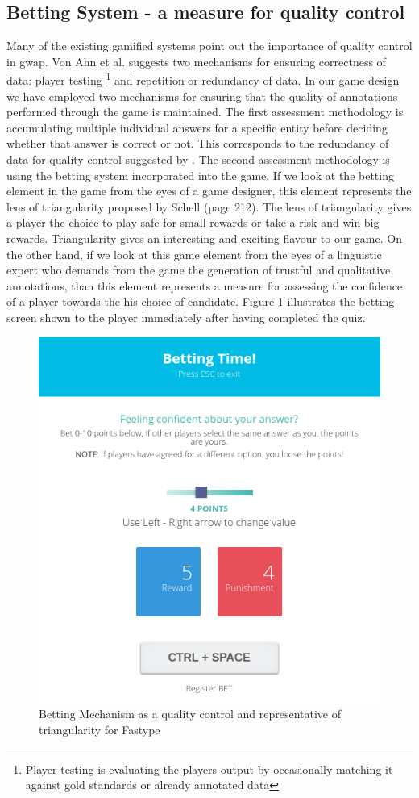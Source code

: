 \subsection{Betting System - a measure for quality control}
Many of the existing gamified systems point out the importance of quality control in \ac{gwap}. Von Ahn et al. \cite{44} suggests two mechanisms for ensuring correctness of data: player testing \footnote{Player testing is evaluating the players output by occasionally matching it against gold standards or already annotated data} and repetition or redundancy of data. In our game design we have employed two mechanisms for ensuring that the quality of annotations performed through the game is maintained. 
The first assessment methodology is accumulating multiple individual answers for a specific entity before deciding whether that answer is correct or not. This corresponds to the redundancy of data for quality control suggested by \cite{44}. The second assessment methodology is using the betting system incorporated into the game. If we look at the betting element in the game from the eyes of a game designer, this element represents the lens of triangularity proposed by Schell \cite{51} (page 212). The lens of triangularity gives a player the choice to play safe for small rewards or take a risk and win big rewards. Triangularity gives an interesting and exciting flavour to our game. On the other hand, if we look at this game element from the eyes of a linguistic expert who demands from the game the generation of trustful and qualitative annotations, than this element represents a measure for assessing the confidence of a player towards the his choice of candidate. Figure \ref{fig:game-bet} illustrates the betting screen shown to the player immediately after having completed the quiz.

\begin{figure}[]
    \centering
    \includegraphics[width=.8\linewidth]{figures/experiment2/game-bet2.png}
    \caption{Betting Mechanism as a quality control and representative of triangularity for Fastype}
    \label{fig:game-bet}
\end{figure}

